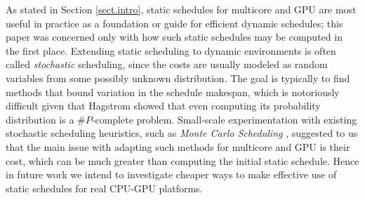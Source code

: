 \documentclass[runningheads]{llncs}
\begin{document}
As stated in Section \ref{sect.intro}, static schedules for multicore and GPU are most useful in practice as a foundation or guide for efficient dynamic schedules; this paper was concerned only with how such static schedules may be computed in the first place. Extending static scheduling to dynamic environments is often called {\em stochastic} scheduling, since the costs are usually modeled as random variables from some possibly unknown distribution. The goal is typically to find methods that bound variation in the schedule makespan, which is notoriously difficult given that Hagstrom \cite{hagstrom88} showed that even computing its probability distribution is a $\#P$-complete problem. Small-scale experimentation with existing stochastic scheduling heuristics, such as {\em Monte Carlo Scheduling} \cite{ZHENG20131673}, suggested to us that the main issue with adapting such methods for multicore and GPU is their cost, which can be much greater than computing the initial static schedule. Hence in future work we intend to investigate cheaper ways to make effective use of static schedules for real CPU-GPU platforms.  
\end{document}
